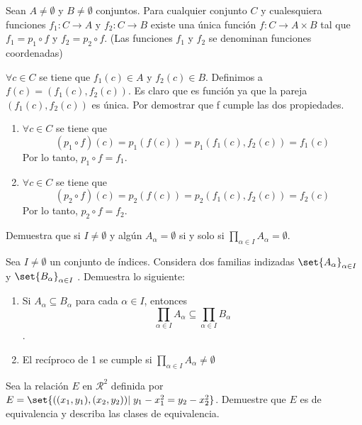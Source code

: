 \documentclass[fc]{tarea}
\begin{document}
\begin{exercise}
   Sean $A \neq \emptyset$ y $B \neq \emptyset$ conjuntos. Para cualquier conjunto $C$ y cualesquiera funciones
   $f_1: C \to A$ y $f_2 : C \to B$ existe una única función $f: C \to A \times B$ tal que $f_1 = p_1 \circ f$
   y $f_2 = p_2 \circ f$. (Las funciones $f_1$ y $f_2$ se denominan funciones coordenadas)
\end{exercise}

\begin{solution}
   $\forall c \in C$ se tiene que $f_1(c) \in A$ y $f_2(c) \in B$. Definimos a $f(c) = (f_1(c), f_2(c))$.
   Es claro que es función ya que la pareja $(f_1(c), f_2(c))$ es única. Por demostrar que f cumple las 
   dos propiedades.
   \begin{enumerate}
      \item $\forall c \in C$ se tiene que $$ (p_1 \circ f)(c) = p_1(f(c)) = p_1(f_1(c), f_2(c)) = f_1(c)$$
            Por lo tanto, $p_1 \circ f = f_1$.
      \item $\forall c \in C$ se tiene que $$ (p_2 \circ f)(c) = p_2(f(c)) = p_2(f_1(c), f_2(c)) = f_2(c)$$
            Por lo tanto, $p_2 \circ f = f_2$. 
   \end{enumerate}
\end{solution}

\begin{exercise}
   Demuestra que si $I\neq \emptyset$ y algún $A_\alpha = \emptyset$ si y solo si $\prod_{\alpha \in I} A_{\alpha} = \emptyset$.
\end{exercise}

\begin{exercise}
   Sea $I \neq \emptyset$ un conjunto de índices. Considera dos familias indizadas $\set{A_{\alpha}}_{\alpha \in I}$ 
   y $\set{B_{\alpha}}_{\alpha \in I}$ . Demuestra lo siguiente:
   \begin{enumerate}
      \item Si $A_{\alpha} \subseteq B_{\alpha}$ para cada $\alpha \in I$, entonces
         $$\prod_{\alpha \in I} A_{\alpha} \subseteq \prod_{\alpha \in I} B_{\alpha}$$.
      \item El recíproco de 1 se cumple si $\prod_{\alpha \in I} A_{\alpha} \neq \emptyset$
   \end{enumerate}
\end{exercise}

\begin{exercise}
   Sea la relación $E$ en $\mathcal{R}^2$ definida por $E = \set{((x_1,y_1),(x_2,y_2)) |\; y_1 - x_1^2 = y_2 - x_2^2 }$. Demuestre que $E$ es de equivalencia y describa las clases de equivalencia.
\end{exercise}
\end{document}
